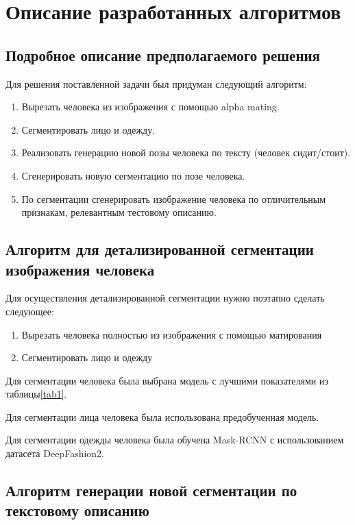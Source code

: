 \documentclass[times,specification,annotation]{itmo-student-thesis}
\begin{document}
\chapter{Описание разработанных алгоритмов}

\section{Подробное описание предполагаемого решения}

Для решения поставленной задачи был придуман следующий алгоритм:
\begin{enumerate}
    \item Вырезать человека из изображения с помощью alpha mating.
    \item Сегментировать лицо и одежду.
    \item Реализовать генерацию новой позы человека по тексту (человек сидит/стоит).
    \item Сгенерировать новую сегментацию по позе человека.
    \item По сегментации сгенерировать изображение человека по отличительным признакам, релевантным тестовому описанию.
\end{enumerate}

\section{Алгоритм для детализированной сегментации изображения человека}

Для осуществления детализированной сегментации нужно поэтапно сделать следующее:
\begin{enumerate}
    \item{Вырезать человека полностью из изображения с помощью матирования}
    \item{Сегментировать лицо и одежду}
\end{enumerate}

Для сегментации человека была выбрана модель с лучшими показателями\cite{trimap-free-matting} из таблицы\ref{tab1}.

Для сегментации лица человека была использована предобученная модель\cite{dsfd}.

Для сегментации одежды человека была обучена Mask-RCNN\cite{mask-rcnn} с использованием датасета DeepFashion2\cite{deepfashion2}.

\section{Алгоритм генерации новой сегментации по текстовому описанию}
\end{document}
